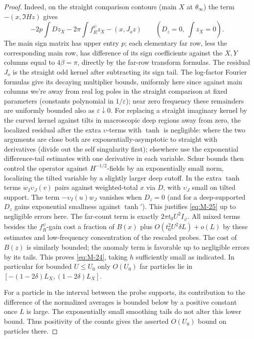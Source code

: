 \begin{proof}
Indeed, on the straight comparison contours (main \(X\) at \(\theta_\infty\)) the term \(-(x,\Im H z)\) gives
\begin{equation}
 -2p\int Dz_X-2\pi\int f_R^\psi z_X-(x,J_o z)
 \qquad(D_z=0,\ \int z_X=0).
 \label{eq:M-25}
\end{equation}
The main sign matrix has upper entry \(p\); each elementary far row, less the corresponding main row, has difference of its sign coefficients against the \(X,Y\) columns equal to \(4\beta=\pi\), directly by the far-row transform formulas. The residual \(J_o\) is the straight odd kernel after subtracting its sign tail. The log-factor Fourier formulas give its decaying multiplier bounds, uniformly here since against main columns we're away from real log poles in the straight comparison at fixed parameters (constants polynomial in \(1/\varepsilon\)); near zero frequency these remainders are uniformly bounded also as \(\varepsilon\downarrow0\). For replacing a straight imaginary kernel by the curved kernel against tilts in macroscopic deep regions away from zero, the localized residual after the extra \(\upsilon\)-terms with \(\tanh\) is negligible: where the two arguments are close both are exponentially-asymptotic to straight with derivatives (divide out the self singularity first); elsewhere use the exponential difference-tail estimates with one derivative in each variable. Schur bounds then control the operator against \(H^{-1/2}\)-fields by an exponentially small norm, localizing the tilted variable by a slightly larger deep cutoff. In the extra \(\tanh\) terms \(w_I \upsilon_J(v)\) pairs against weighted-total \(x\) via \(D\), with \(\upsilon_J\) small on tilted support. The term \(-\upsilon_I(u)w_J\) vanishes when \(D_z=0\) (and for a deep-supported \(D_z\) gains exponential smallness against \(\tanh'\)). This justifies \eqref{eq:M-25} up to negligible errors here. The far-count term is exactly \(2\pi t_0 U^2 I_\varphi\). All mixed terms besides the \(f_R^\psi\)-gain cost a fraction of \(B(x)\) plus \(O(t_0^2 U^2\delta L)+o(L)\) by these estimates and low-frequency concentration of the rescaled probes. The cost of \(B(z)\) is similarly bounded; the anomaly term is favorable up to negligible errors by its tails. This proves \eqref{eq:M-24}, taking \(h\) sufficiently small as indicated. In particular for bounded \(U\le U_0\) only \(O(U_0)\) far particles lie in \([-(1-2\delta)L_X,(1-2\delta)L_X]\).

For a particle in the interval between the probe supports,
its contribution to the difference of the normalized averages is bounded
below by a positive constant once \(L\) is large. The exponentially
small smoothing tails do not alter this lower bound. Thus positivity of
the counts gives the asserted \(O(U_0)\) bound on particles there.

\end{proof}

